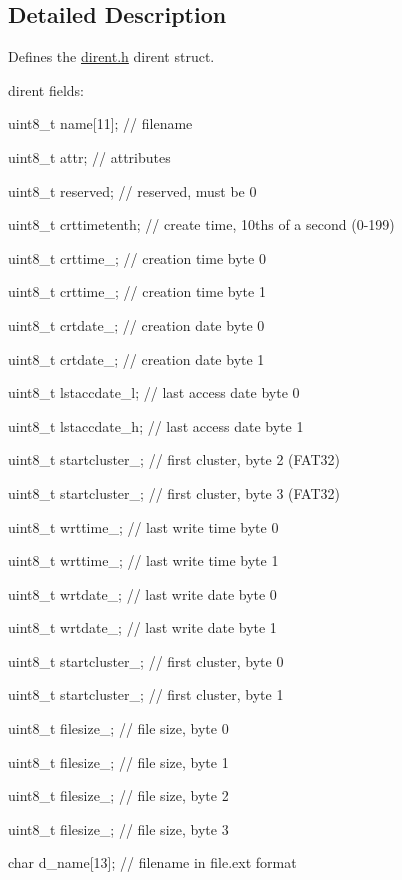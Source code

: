 \subsection{Detailed Description}
Defines the \mbox{\hyperlink{dirent_8h}{dirent.\+h}} dirent struct. 

dirent fields\+: \begin{DoxyItemize}
\item uint8\+\_\+t name\mbox{[}11\mbox{]}; // filename \item uint8\+\_\+t attr; // attributes \item uint8\+\_\+t reserved; // reserved, must be 0 \item uint8\+\_\+t crttimetenth; // create time, 10ths of a second (0-\/199) \item uint8\+\_\+t crttime\+\_; // creation time byte 0 \item uint8\+\_\+t crttime\+\_; // creation time byte 1 \item uint8\+\_\+t crtdate\+\_; // creation date byte 0 \item uint8\+\_\+t crtdate\+\_; // creation date byte 1 \item uint8\+\_\+t lstaccdate\+\_\+l; // last access date byte 0 \item uint8\+\_\+t lstaccdate\+\_\+h; // last access date byte 1 \item uint8\+\_\+t startcluster\+\_; // first cluster, byte 2 (F\+A\+T32) \item uint8\+\_\+t startcluster\+\_; // first cluster, byte 3 (F\+A\+T32) \item uint8\+\_\+t wrttime\+\_; // last write time byte 0 \item uint8\+\_\+t wrttime\+\_; // last write time byte 1 \item uint8\+\_\+t wrtdate\+\_; // last write date byte 0 \item uint8\+\_\+t wrtdate\+\_; // last write date byte 1 \item uint8\+\_\+t startcluster\+\_; // first cluster, byte 0 \item uint8\+\_\+t startcluster\+\_; // first cluster, byte 1 \item uint8\+\_\+t filesize\+\_; // file size, byte 0 \item uint8\+\_\+t filesize\+\_; // file size, byte 1 \item uint8\+\_\+t filesize\+\_; // file size, byte 2 \item uint8\+\_\+t filesize\+\_; // file size, byte 3 \item char d\+\_\+name\mbox{[}13\mbox{]}; // filename in file.\+ext format \end{DoxyItemize}


